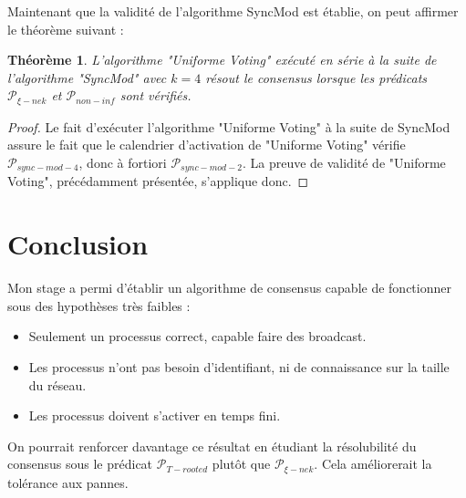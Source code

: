 \documentclass{article}
\newtheorem{theorem}{Théorème}
\begin{document}
Maintenant que la validité de l'algorithme SyncMod est établie, on peut affirmer le théorème suivant :

\begin{theorem}
	L'algorithme "Uniforme Voting" exécuté en série à la suite de l'algorithme "SyncMod" avec $k = 4$
	résout le consensus lorsque les prédicats $\mathcal{P}_{\xi-nek}$ et $\mathcal{P}_{non-inf}$ sont vérifiés.
\end{theorem}
\begin{proof}
	Le fait d'exécuter l'algorithme "Uniforme Voting" à la suite de SyncMod assure le fait que le calendrier d'activation de "Uniforme Voting" vérifie $\mathcal{P}_{sync-mod-4}$,
	donc à fortiori $\mathcal{P}_{sync-mod-2}$.
	La preuve de validité de "Uniforme Voting", précédamment présentée, s'applique donc.
\end{proof}

\section{Conclusion}

Mon stage a permi d'établir un algorithme de consensus capable de fonctionner sous des hypothèses très faibles :
\begin{itemize}
	\item Seulement un processus correct, capable faire des broadcast.
	\item Les processus n'ont pas besoin d'identifiant, ni de connaissance sur la taille du réseau.
	\item Les processus doivent s'activer en temps fini.
\end{itemize}

On pourrait renforcer davantage ce résultat en étudiant la résolubilité du consensus sous le prédicat $\mathcal{P}_{T-rooted}$ plutôt que $\mathcal{P}_{\xi-nek}$.
Cela améliorerait la tolérance aux pannes.

\printbibliography
\end{document}
